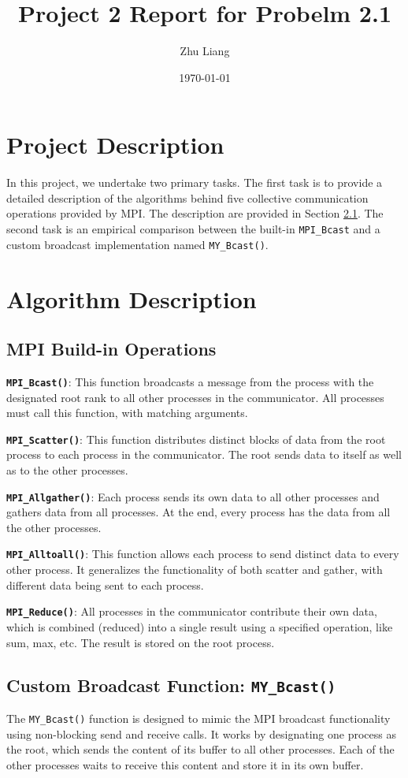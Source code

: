 \documentclass[12pt,a4paper]{article}
\title{Project 2 Report for Probelm 2.1}
\author{Zhu Liang}
\date{\today}
\begin{document}
\maketitle

\section{Project Description}
In this project, we undertake two primary tasks. 
The first task is to provide a detailed description of the algorithms behind five collective communication operations provided by MPI.
The description are provided in Section \ref{sec:mpi_buildin}.
The second task is an empirical comparison between the built-in \texttt{MPI\_Bcast} and a custom broadcast implementation named \texttt{MY\_Bcast()}.


\section{Algorithm Description}
\subsection{MPI Build-in Operations}
\label{sec:mpi_buildin}


\textbf{\texttt{MPI\_Bcast()}}: This function broadcasts a message from the process with the designated root rank to all other processes in the communicator. All processes must call this function, with matching arguments.

\textbf{\texttt{MPI\_Scatter()}}: This function distributes distinct blocks of data from the root process to each process in the communicator. The root sends data to itself as well as to the other processes.

\textbf{\texttt{MPI\_Allgather()}}: Each process sends its own data to all other processes and gathers data from all processes. At the end, every process has the data from all the other processes.

\textbf{\texttt{MPI\_Alltoall()}}: This function allows each process to send distinct data to every other process. It generalizes the functionality of both scatter and gather, with different data being sent to each process.

\textbf{\texttt{MPI\_Reduce()}}: All processes in the communicator contribute their own data, which is combined (reduced) into a single result using a specified operation, like sum, max, etc. The result is stored on the root process.


\subsection{Custom Broadcast Function: \texttt{MY\_Bcast()}}
The \texttt{MY\_Bcast()} function is designed to mimic the MPI broadcast functionality using non-blocking send and receive  calls. 
It works by designating one process as the root, which sends the content of its buffer to all other processes. 
Each of the other processes waits to receive this content and store it in its own buffer.
\end{document}
